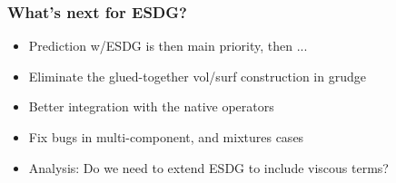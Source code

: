 \begin{frame}\frametitle{What's next for ESDG?}
\begin{itemize}
\item Prediction w/ESDG is then main priority, then ...
\item Eliminate the glued-together vol/surf construction in grudge
\item Better integration with the native operators
\item Fix bugs in multi-component, and mixtures cases
\item Analysis: Do we need to extend ESDG to include viscous terms?
\end{itemize}
\end{frame}
